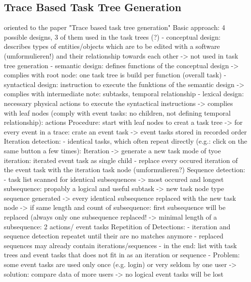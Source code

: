 \subsection{Trace Based Task Tree Generation}
oriented to the paper "Trace based task tree generation"
Basic approach: 4 possible designs, 3 of them used in the task trees (?)
  - conceptual design: describes types of entities/objects which are to be edited with a software (umformulieren!) and their relationship towards each other
    -> not used in task tree generation
  - semantic design: defines functions of the conceptual design
    -> complies with root node: one task tree is build per function (overall task)
  - syntactical design: instruction to execute the funktions of the semantic design
    -> complies with intermediate note: subtasks, temporal relationship
  - lexical design: necessary physical actions to execute the syntactical instructions
    -> complies with leaf nodes (comply with event tasks: no children, not defining temporal relationship): actions
Procedure: start with leaf nodes to creat a task tree
  -> for every event in a trace: crate an event task
  -> event tasks stored in recorded order
Iteration detection:
  - identical tasks, which often repeat directly (e.g.: click on the same button a few times): Iteration
    -> generate a new task mode of tyoe iteration: iterated event task as single child
  - replace every occured iteration of the event task with the iteration task node (umformulieren?)
Sequence detection:
  - task list scanned for identical subsequences
    -> most occured and longest subsequence: propably a logical and useful subtask
      -> new task node type sequence generated
    -> every identical subsequence replaced with the new task node 
    -> if same length and count of subsequence: first subsequence will be replaced (always only one subsequence replaced!
    -> minimal length of a subsequence: 2 actions/ event tasks
Repetition of Detections:
  - iteration and sequence detection repeatet until their are no matches anymore
  - replaced sequences may already contain iterations/sequences 
  - in the end: list with task trees and event tasks that does not fit in as an iteration or sequence
  - Problem: some event tasks are used only once (e.g. login) or very seldom by one user
    -> solution: compare data of more users -> no logical event tasks will be lost
